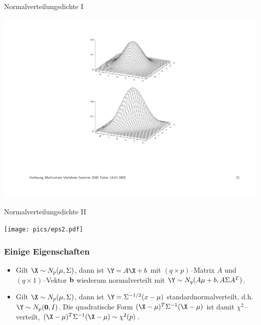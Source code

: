 \begin{frame}{Normalverteilungsdichte I}
\begin{center}
\includegraphics[scale=0.5]{eps1.pdf}
\end{center}
\end{frame}

\begin{frame}{Normalverteilungsdichte II }
\begin{center}
\texttt{[image: pics/eps2.pdf]}
\end{center}
\end{frame}



\begin{frame}\frametitle{Einige Eigenschaften}
\begin{itemize}
\item Gilt $\X\sim N_p(\mu,\Sigma)$, dann ist $\Y = A \X + b$ mit
$(q\times p)$--Matrix $A$ und \newline $(q\times 1)$--Vektor ${\bf
b}$ wiederum nor\-mal\-ver\-teilt mit $\Y\sim N_q(A\mu + b, A\Sigma
A^T)$.
\item Gilt $\X\sim N_p(\mu,\Sigma)$, dann ist $\Y = \Sigma^{-1/2}(x-\mu)$
stan\-dard\-nor\-mal\-ver\-teilt, d.h. $\Y\sim N_p({\bf 0},I)$. Die
quadratische Form $(\X-\mu)^T\Sigma^{-1}(\X-\mu)$ ist damit
$\chi^2$--verteilt, $(\X-\mu)^T\Sigma^{-1}(\X-\mu)\sim\chi^2(p)\ .$
\end{itemize}
\end{frame}

